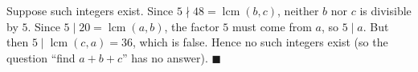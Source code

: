 Suppose such integers exist. Since $5\nmid 48=\operatorname{lcm}(b,c)$, neither $b$ nor $c$ is divisible by $5$. Since $5\mid 20=\operatorname{lcm}(a,b)$, the factor $5$ must come from $a$, so $5\mid a$. But then $5\mid\operatorname{lcm}(c,a)=36$, which is false. Hence no such integers exist (so the question ``find $a+b+c$'' has no answer). $\blacksquare$
